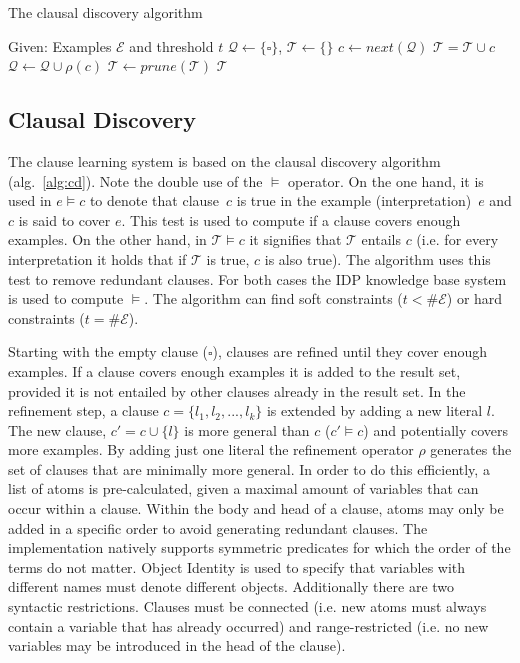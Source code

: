 \documentclass[letterpaper]{article}
\newcommand{\sym}[1]{\ensuremath{\mathcal{#1}}}
\theoremstyle{definition}
\begin{document}
\begin{algorithm}
  \caption{The clausal discovery algorithm}
  \label{alg:cd}

  \begin{algorithmic}
  \State Given: Examples \sym{E} and threshold $t$
  \State $\sym{Q} \gets \{\square\}$, $\sym{T} \gets \{\}$
  \While{$\#\sym{Q} > 0$}
    \State $c \gets next(\sym{Q})$
    \If{$\#\{e \in \sym{E} | e \models c\} \geq t$}
      \If{$\lnot (\sym{T} \models c)$}
        \State $\sym{T} = \sym{T} \cup c$
      \EndIf
    \Else
      \State $\sym{Q} \gets \sym{Q} \cup \rho(c)$
    \EndIf
  \EndWhile
  \State $\sym{T} \gets prune(\sym{T})$
  \State \Return \sym{T}
  \end{algorithmic}
\end{algorithm}

\subsection{Clausal Discovery}
The clause learning system is based on the clausal discovery algorithm (alg.~\ref{alg:cd}).
Note the double use of the $\models$ operator. 
On the one hand, it is used in $e \models c$ to denote that clause~$c$ is true in the example (interpretation)~$e$ and $c$ is said to cover $e$.
This test is used to compute if a clause covers enough examples.
On the other hand, in $\sym{T} \models c$ it signifies that \sym{T} entails $c$ (i.e. for every interpretation it holds that if \sym{T} is true, $c$ is also true).
The algorithm uses this test to remove redundant clauses.
For both cases the IDP knowledge base system \cite{de2013prototype,wittocx2008idp} is used to compute $\models$.
The algorithm can find soft constraints ($t < \# \sym{E}$) or hard constraints ($t = \# \sym{E}$).

Starting with the empty clause ($\square$), clauses are refined until they cover enough examples.
If a clause covers enough examples it is added to the result set, provided it is not entailed by other clauses already in the result set.
In the refinement step, a clause $c = \{l_1, l_2, ..., l_k\}$ is extended by adding a new literal $l$.
The new clause, $c' = c \cup \{l\}$ is more general than $c$ ($c' \models c$) and potentially covers more examples.
By adding just one literal the refinement operator $\rho$ generates the set of clauses that are minimally more general.
In order to do this efficiently, a list of atoms is pre-calculated, given a maximal amount of variables that can occur within a clause.
Within the body and head of a clause, atoms may only be added in a specific order to avoid generating redundant clauses.
The implementation natively supports symmetric predicates for which the order of the terms do not matter.
Object Identity is used to specify that variables with different names must denote different objects.
Additionally there are two syntactic restrictions.
Clauses must be connected (i.e. new atoms must always contain a variable that has already occurred) and range-restricted (i.e. no new variables may be introduced in the head of the clause).
\end{document}
